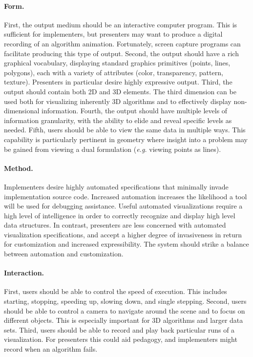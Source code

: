 \paragraph{Form.} First, the output medium should be an interactive computer
program. This is sufficient for implementers, but presenters may want to produce
a digital recording of an algorithm animation. Fortunately, screen capture
programs can facilitate producing this type of output. Second, the output should
have a rich graphical vocabulary, displaying standard graphics primitives
(points, lines, polygons), each with a variety of attributes (color,
transparency, pattern, texture). Presenters in particular desire highly
expressive output. Third, the output should contain both 2D and 3D elements.
The third dimension can be used both for visualizing inherently 3D algorithms
and to effectively display non-dimensional information. Fourth, the output
should have multiple levels of information granularity, with the ability to
elide and reveal specific levels as needed. Fifth, users should be able to view
the same data in multiple ways. This capability is particularly pertinent in
geometry where insight into a problem may be gained from viewing a dual
formulation (\emph{e.g.} viewing points as lines).

\paragraph{Method.} Implementers desire highly automated specifications that
minimally invade implementation source code. Increased automation increases the
likelihood a tool will be used for debugging assistance. Useful automated
visualizations require a high level of intelligence in order to correctly
recognize and display high level data structures. In contrast, presenters are
less concerned with automated visualization specifications, and accept a higher
degree of invasiveness in return for customization and increased expressibility.
The system should strike a balance between automation and customization.

\paragraph{Interaction.} First, users should be able to control the speed of
execution. This includes starting, stopping, speeding up, slowing down, and
single stepping. Second, users should be able to control a camera to navigate
around the scene and to focus on different objects. This is especially important
for 3D algorithms and larger data sets. Third, users should be able to record
and play back particular runs of a visualization. For presenters this could aid
pedagogy, and implementers might record when an algorithm fails.

